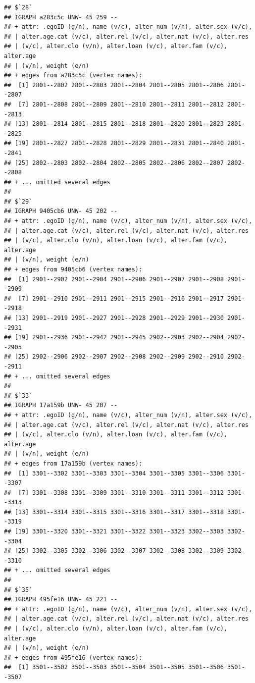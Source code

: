 \documentclass[
]{book}
\begin{document}
\begin{verbatim}
## $`28`
## IGRAPH a283c5c UNW- 45 259 -- 
## + attr: .egoID (g/n), name (v/c), alter_num (v/n), alter.sex (v/c),
## | alter.age.cat (v/c), alter.rel (v/c), alter.nat (v/c), alter.res
## | (v/c), alter.clo (v/n), alter.loan (v/c), alter.fam (v/c), alter.age
## | (v/n), weight (e/n)
## + edges from a283c5c (vertex names):
##  [1] 2801--2802 2801--2803 2801--2804 2801--2805 2801--2806 2801--2807
##  [7] 2801--2808 2801--2809 2801--2810 2801--2811 2801--2812 2801--2813
## [13] 2801--2814 2801--2815 2801--2818 2801--2820 2801--2823 2801--2825
## [19] 2801--2827 2801--2828 2801--2829 2801--2831 2801--2840 2801--2841
## [25] 2802--2803 2802--2804 2802--2805 2802--2806 2802--2807 2802--2808
## + ... omitted several edges
## 
## $`29`
## IGRAPH 9405cb6 UNW- 45 202 -- 
## + attr: .egoID (g/n), name (v/c), alter_num (v/n), alter.sex (v/c),
## | alter.age.cat (v/c), alter.rel (v/c), alter.nat (v/c), alter.res
## | (v/c), alter.clo (v/n), alter.loan (v/c), alter.fam (v/c), alter.age
## | (v/n), weight (e/n)
## + edges from 9405cb6 (vertex names):
##  [1] 2901--2902 2901--2904 2901--2906 2901--2907 2901--2908 2901--2909
##  [7] 2901--2910 2901--2911 2901--2915 2901--2916 2901--2917 2901--2918
## [13] 2901--2919 2901--2927 2901--2928 2901--2929 2901--2930 2901--2931
## [19] 2901--2936 2901--2942 2901--2945 2902--2903 2902--2904 2902--2905
## [25] 2902--2906 2902--2907 2902--2908 2902--2909 2902--2910 2902--2911
## + ... omitted several edges
## 
## $`33`
## IGRAPH 17a159b UNW- 45 207 -- 
## + attr: .egoID (g/n), name (v/c), alter_num (v/n), alter.sex (v/c),
## | alter.age.cat (v/c), alter.rel (v/c), alter.nat (v/c), alter.res
## | (v/c), alter.clo (v/n), alter.loan (v/c), alter.fam (v/c), alter.age
## | (v/n), weight (e/n)
## + edges from 17a159b (vertex names):
##  [1] 3301--3302 3301--3303 3301--3304 3301--3305 3301--3306 3301--3307
##  [7] 3301--3308 3301--3309 3301--3310 3301--3311 3301--3312 3301--3313
## [13] 3301--3314 3301--3315 3301--3316 3301--3317 3301--3318 3301--3319
## [19] 3301--3320 3301--3321 3301--3322 3301--3323 3302--3303 3302--3304
## [25] 3302--3305 3302--3306 3302--3307 3302--3308 3302--3309 3302--3310
## + ... omitted several edges
## 
## $`35`
## IGRAPH 495fe16 UNW- 45 221 -- 
## + attr: .egoID (g/n), name (v/c), alter_num (v/n), alter.sex (v/c),
## | alter.age.cat (v/c), alter.rel (v/c), alter.nat (v/c), alter.res
## | (v/c), alter.clo (v/n), alter.loan (v/c), alter.fam (v/c), alter.age
## | (v/n), weight (e/n)
## + edges from 495fe16 (vertex names):
##  [1] 3501--3502 3501--3503 3501--3504 3501--3505 3501--3506 3501--3507

\end{verbatim}
\end{document}
